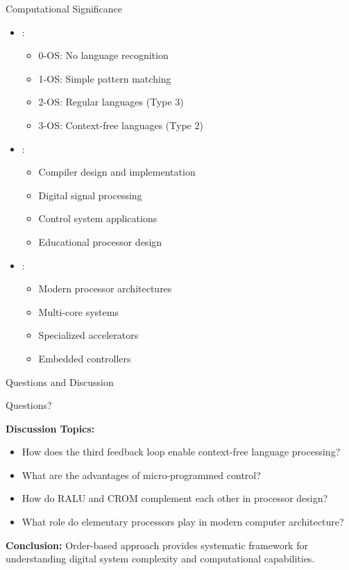 \begin{frame}{Computational Significance}
\begin{itemize}
\item {}:
\begin{itemize}
\item 0-OS: No language recognition
\item 1-OS: Simple pattern matching
\item 2-OS: Regular languages (Type 3)
\item 3-OS: Context-free languages (Type 2)
\end{itemize}
\vspace{0.3cm}
\item {}:
\begin{itemize}
\item Compiler design and implementation
\item Digital signal processing
\item Control system applications
\item Educational processor design
\end{itemize}
\vspace{0.3cm}
\item {}:
\begin{itemize}
\item Modern processor architectures
\item Multi-core systems
\item Specialized accelerators
\item Embedded controllers
\end{itemize}
\end{itemize}
\end{frame}

\begin{frame}{Questions and Discussion}
\begin{center}
\Large
Questions?

\vspace{1cm}

\normalsize
\textbf{Discussion Topics:}
\begin{itemize}
\item How does the third feedback loop enable context-free language processing?
\item What are the advantages of micro-programmed control?
\item How do RALU and CROM complement each other in processor design?
\item What role do elementary processors play in modern computer architecture?
\end{itemize}

\vspace{0.5cm}
\textbf{Conclusion:} Order-based approach provides systematic framework for understanding digital system complexity and computational capabilities.
\end{center}
\end{frame}



